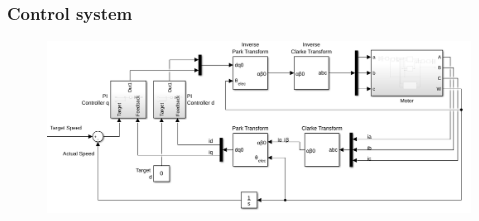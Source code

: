 

\subsubsection{Control system}
\label{sec:control_system}

\begin{figure}[H]
	\centering
	\includegraphics[width=0.9\linewidth]{pictures/control/control_model.png}
	\caption{}
	\label{fig:control_system}
\end{figure}